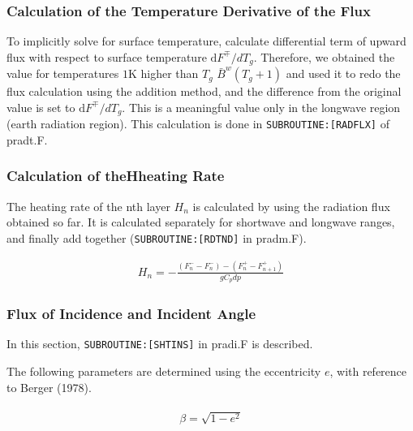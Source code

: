 \hypertarget{calculation-of-the-temperature-derivative-of-the-flux}{%
\subsubsection{Calculation of the Temperature Derivative of the
Flux}\label{calculation-of-the-temperature-derivative-of-the-flux}}

To implicitly solve for surface temperature, calculate differential term
of upward flux with respect to surface temperature
\(\mathrm{d}F^{\mp}/dT_{g}\). Therefore, we obtained the value for
temperatures \(1\text{K}\) higher than \(T_g\)
\(\bar{B}^{w}\left(T_{g}+1\right)\) and used it to redo the flux
calculation using the addition method, and the difference from the
original value is set to \(\mathrm{d}F^{\mp}/dT_{g}\). This is a
meaningful value only in the longwave region (earth radiation region).
This calculation is done in \texttt{SUBROUTINE:{[}RADFLX{]}} of pradt.F.

\hypertarget{calculation-of-thehheating-rate}{%
\subsubsection{Calculation of theHheating
Rate}\label{calculation-of-thehheating-rate}}

The heating rate of the nth layer \(H_n\) is calculated by using the
radiation flux obtained so far. It is calculated separately for
shortwave and longwave ranges, and finally add together
(\texttt{SUBROUTINE:{[}RDTND{]}} in pradm.F).

\begin{eqnarray}
H_{n}=-\frac{\left(F_{n}^{-}-F_{n}^{-}\right)-\left(F_{n}^{+}-F_{n+1}^{+}\right)}{g C_{p} d p}
\end{eqnarray}

\hypertarget{flux-of-incidence-and-incident-angle}{%
\subsubsection{Flux of Incidence and Incident
Angle}\label{flux-of-incidence-and-incident-angle}}

In this section, \texttt{SUBROUTINE:{[}SHTINS{]}} in pradi.F is
described.

The following parameters are determined using the eccentricity \(e\),
with reference to Berger (1978).

\begin{eqnarray}
\begin{array}{l}
\beta=\sqrt{1-e^{2}}
\end{array}
\end{eqnarray}

